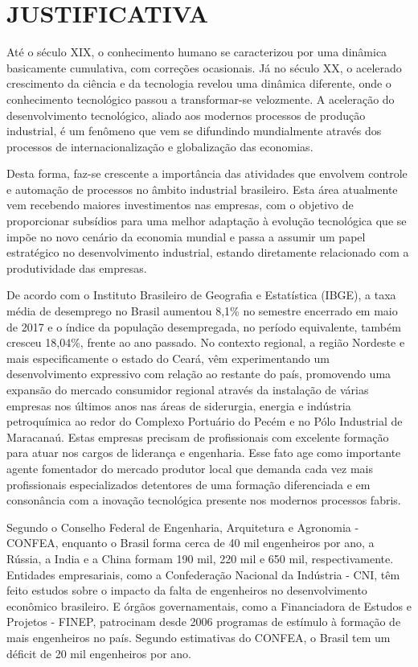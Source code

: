 \clearpage
\section{JUSTIFICATIVA}
\label{JUSTIFICATIVA}

Até o século XIX, o conhecimento humano se caracterizou por uma dinâmica basicamente cumulativa, com correções ocasionais. Já no século XX, o acelerado crescimento da ciência e da tecnologia revelou uma dinâmica diferente, onde o conhecimento tecnológico passou a transformar-se velozmente. A aceleração do desenvolvimento tecnológico, aliado aos modernos processos de produção industrial, é um fenômeno que vem se difundindo mundialmente através dos processos de internacionalização e globalização das economias.

Desta forma, faz-se crescente a importância das atividades que envolvem controle e automação de processos no âmbito industrial brasileiro. Esta área atualmente vem recebendo maiores investimentos nas empresas, com o objetivo de proporcionar subsídios para uma melhor adaptação à evolução tecnológica que se impõe no novo cenário da economia mundial e passa a assumir um papel estratégico no desenvolvimento industrial, estando diretamente relacionado com a produtividade das empresas.

De acordo com o Instituto Brasileiro de Geografia e Estatística (IBGE), a taxa média de desemprego no Brasil aumentou 8,1\% no semestre encerrado em maio de 2017 e o índice da população desempregada, no período equivalente, também cresceu 18,04\%, frente ao ano passado. No contexto regional, a região Nordeste e mais especificamente o estado do Ceará, vêm experimentando um desenvolvimento expressivo com relação ao restante do país, promovendo uma expansão do mercado consumidor regional através da instalação de várias empresas nos últimos anos nas áreas de siderurgia, energia e indústria petroquímica ao redor do Complexo Portuário do Pecém e no Pólo Industrial de Maracanaú. Estas empresas precisam de profissionais com excelente formação para atuar nos cargos de liderança e engenharia. Esse fato age como importante agente fomentador do mercado produtor local que demanda cada vez mais profissionais especializados detentores de uma formação diferenciada e em consonância com a inovação tecnológica presente nos modernos processos fabris.

Segundo o Conselho Federal de Engenharia, Arquitetura e Agronomia - CONFEA, enquanto o Brasil forma cerca de 40 mil engenheiros por ano, a Rússia, a India e a China formam 190 mil, 220 mil e 650 mil, respectivamente. Entidades empresariais, como a Confederação Nacional da Indústria - CNI, têm feito estudos sobre o impacto da falta de engenheiros no desenvolvimento econômico brasileiro. E órgãos governamentais, como a Financiadora de Estudos e Projetos - FINEP, patrocinam desde 2006 programas de estímulo à formação de mais engenheiros no país. Segundo estimativas do CONFEA, o Brasil tem um déficit de 20 mil engenheiros por ano.


